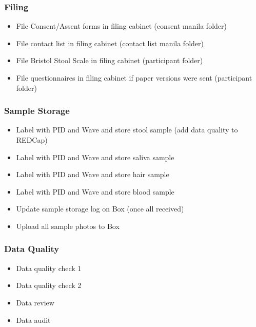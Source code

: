 \documentclass[]{book}
\providecommand{\tightlist}{%
  \setlength{\itemsep}{0pt}\setlength{\parskip}{0pt}}
\begin{document}
\hypertarget{filing-10}{%
\subsubsection{Filing}\label{filing-10}}

\begin{itemize}
\tightlist
\item
  File Consent/Assent forms in filing cabinet (consent manila folder)
\item
  File contact list in filing cabinet (contact list manila folder)
\item
  File Bristol Stool Scale in filing cabinet (participant folder)
\item
  File questionnaires in filing cabinet if paper versions were sent (participant folder)
\end{itemize}

\hypertarget{sample-storage-4}{%
\subsubsection{Sample Storage}\label{sample-storage-4}}

\begin{itemize}
\tightlist
\item
  Label with PID and Wave and store stool sample (add data quality to REDCap)
\item
  Label with PID and Wave and store saliva sample
\item
  Label with PID and Wave and store hair sample
\item
  Label with PID and Wave and store blood sample
\item
  Update sample storage log on Box (once all received)
\item
  Upload all sample photos to Box
\end{itemize}

\hypertarget{data-quality-4}{%
\subsubsection{Data Quality}\label{data-quality-4}}

\begin{itemize}
\tightlist
\item
  Data quality check 1
\item
  Data quality check 2
\item
  Data review
\item
  Data audit
\end{itemize}
\end{document}

